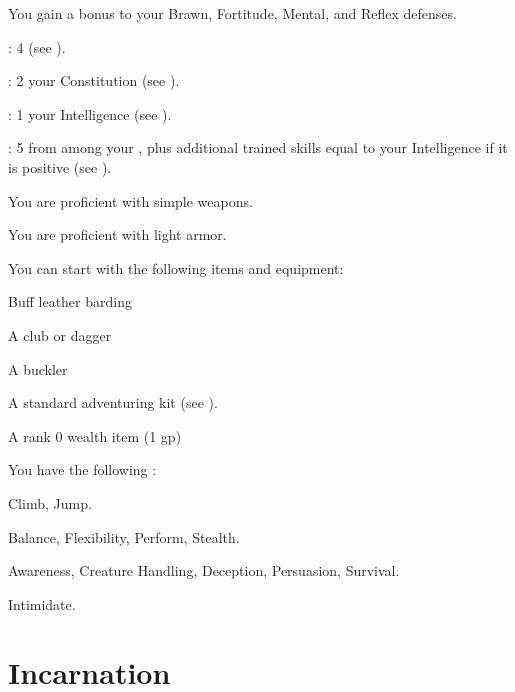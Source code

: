       You gain a  bonus to your Brawn, Fortitude, Mental, and Reflex defenses.

      \begin{raggeditemize}
          \item {}: 4 (see ).
          \item {}: 2 \add your Constitution (see ).
          \item {}: 1 \add your Intelligence (see ).
          \item {}: 5 from among your , plus additional trained skills equal to your Intelligence if it is positive (see ).
      \end{raggeditemize}

      You are proficient with simple weapons.

      You are proficient with light armor.

    You can start with the following items and equipment:
    \begin{raggeditemize}
        \item Buff leather barding
        \item A club or dagger
        \item A buckler
        \item A standard adventuring kit (see ).
        \item A rank 0 wealth item (1 gp)
    \end{raggeditemize}

      You have the following :
      \begin{raggeditemize}
        \item {} Climb, Jump.
        \item {} Balance, Flexibility, Perform, Stealth.
        \item {} Awareness, Creature Handling, Deception, Persuasion, Survival.
        \item {} Intimidate.
      \end{raggeditemize}

\section{Incarnation}

